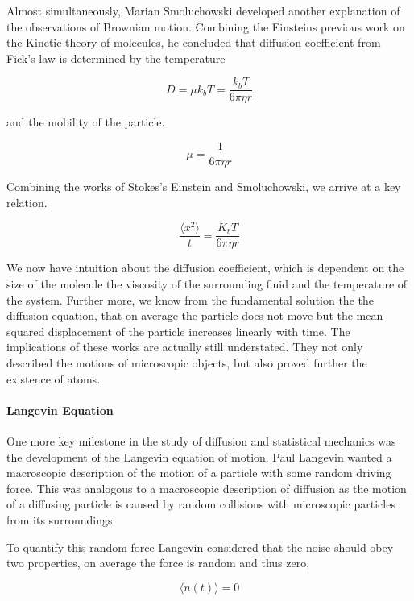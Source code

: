 \documentclass{article}
\begin{document}
Almost simultaneously, Marian Smoluchowski developed another explanation of the observations of Brownian motion. Combining the Einsteins previous work on the Kinetic theory of molecules, he concluded that diffusion coefficient from Fick's law is determined by the temperature

\begin{equation}
D = \mu k_b T = \frac{k_b T}{6\pi\eta r}
\end{equation}

and the mobility of the particle.

\begin{equation}
\mu = \frac{1}{6\pi\eta r}
\end{equation}

Combining the works of Stokes's Einstein and Smoluchowski, we arrive at a key relation.

\begin{equation}
\frac{\langle x^2 \rangle}{t} = \frac{K_b T}{6\pi\eta r}
\end{equation}

We now have intuition about the diffusion coefficient, which is dependent on the size of the molecule the viscosity of the surrounding fluid and the temperature of the system. Further more, we know from the fundamental solution the the diffusion equation, that on average the particle does not move
but the mean squared displacement of the particle
increases linearly with time. The implications of these works are actually still understated. They not only described the motions of microscopic objects, but also proved further the existence of atoms.

\paragraph{Langevin Equation}

One more key milestone in the study of diffusion and statistical mechanics was the development of the Langevin equation of motion. Paul Langevin wanted a macroscopic description of the motion of a particle with some random driving force. This was analogous to a macroscopic description of diffusion as the motion of a diffusing particle is caused by random collisions with microscopic particles from its surroundings.

To quantify this random force Langevin considered that the noise should obey two properties, on average the force is random and thus zero,

\begin{equation}
\langle n(t) \rangle = 0
\end{equation}
\end{document}
